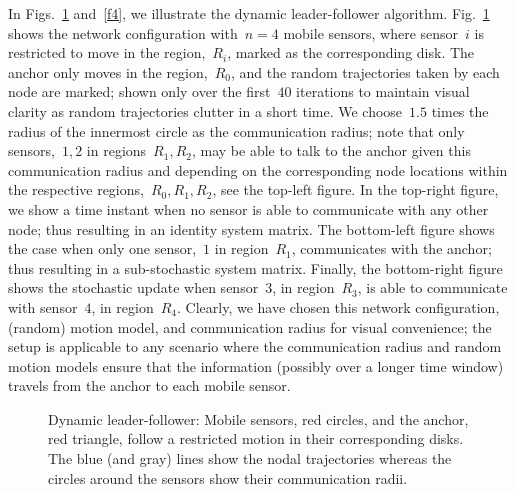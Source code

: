 \documentclass[draftclsnofoot, onecolumn, 12pt]{IEEEtran}
\begin{document}
In Figs.~\ref{f3} and~\ref{f4}, we illustrate the dynamic leader-follower algorithm. Fig.~\ref{f3} shows the network configuration with~$n=4$ mobile sensors, where sensor~$i$ is restricted to move in the region,~$R_i$, marked as the corresponding disk. The anchor only moves in the region,~$R_0$, and the random trajectories taken by each node are marked; shown only over the first~$40$ iterations to maintain visual clarity as random trajectories clutter in a short time. We choose~$1.5$ times the radius of the innermost circle as the communication radius; note that only sensors,~$1,2$ in regions~$R_1,R_2$, may be able to talk to the anchor given this communication radius and depending on the corresponding node locations within the respective regions,~$R_0,R_1,R_2$, see the top-left figure. In the top-right figure, we show a time instant when no sensor is able to communicate with any other node; thus resulting in an identity system matrix. The bottom-left figure shows the case when only one sensor,~$1$ in region~$R_1$, communicates with the anchor; thus resulting in a sub-stochastic system matrix. Finally, the bottom-right figure shows the stochastic update when sensor~$3$, in region~$R_3$, is able to communicate with sensor~$4$, in region~$R_4$. Clearly, we have chosen this network configuration, (random) motion model, and communication radius for visual convenience; the setup is applicable to any scenario where the communication radius and random motion models ensure that the information (possibly over a longer time window) travels from the anchor to each mobile sensor. 
\begin{figure}[!h]
\centering
{}
\caption{Dynamic leader-follower: Mobile sensors, red circles, and the anchor, red triangle, follow a restricted motion in their corresponding disks. The blue (and gray) lines show the nodal trajectories whereas the circles around the sensors show their communication radii.}
\label{f3}
\end{figure}
\end{document}
